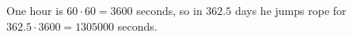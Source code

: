 One hour is $60\cdot60=3600$ seconds, so in $362.5$ days he jumps rope for $362.5\cdot3600=\boxed{1305000}$ seconds.
